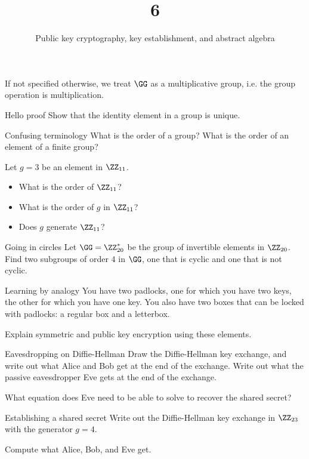 \documentclass{practice}
\title{6}
\subtitle{Public key cryptography, key establishment, and abstract algebra}
\date{\DTMdate{2024-10-16}}
\begin{document}
\maketitle

If not specified otherwise, we treat $\GG$ as a multiplicative group, i.e. the group operation is multiplication.

\begin{task}{Hello proof}
  Show that the identity element in a group is unique.
\end{task}

\begin{task}{Confusing terminology}
  What is the order of a group?
  What is the order of an element of a finite group?

  Let $g = 3$ be an element in $\ZZ_{11}$.
  \begin{itemize}
    \item What is the order of $\ZZ_{11}$?
    \item What is the order of $g$ in $\ZZ_{11}$?
    \item Does $g$ generate $\ZZ_{11}$?
  \end{itemize}
\end{task}

\begin{task}{Going in circles}
  Let $\GG = \ZZ^*_{20}$ be the group of invertible elements in $\ZZ_{20}$.
  Find two subgroups of order $4$ in $\GG$, one that is cyclic and one that is not cyclic.
\end{task}

\begin{task}{Learning by analogy}
  You have two padlocks, one for which you have two keys, the other for which you have one key.
  You also have two boxes that can be locked with padlocks: a regular box and a letterbox.

  Explain symmetric and public key encryption using these elements.
\end{task}

\begin{task}{Eavesdropping on Diffie-Hellman}
  Draw the Diffie-Hellman key exchange, and write out what Alice and Bob get at the end of the exchange.
  Write out what the passive eavesdropper Eve gets at the end of the exchange.

  What equation does Eve need to be able to solve to recover the shared secret?
\end{task}

\begin{task}{Establishing a shared secret}
  Write out the Diffie-Hellman key exchange in $\ZZ_{23}$ with the generator $g = 4$.

  Compute what Alice, Bob, and Eve get.
\end{task}
\end{document}
